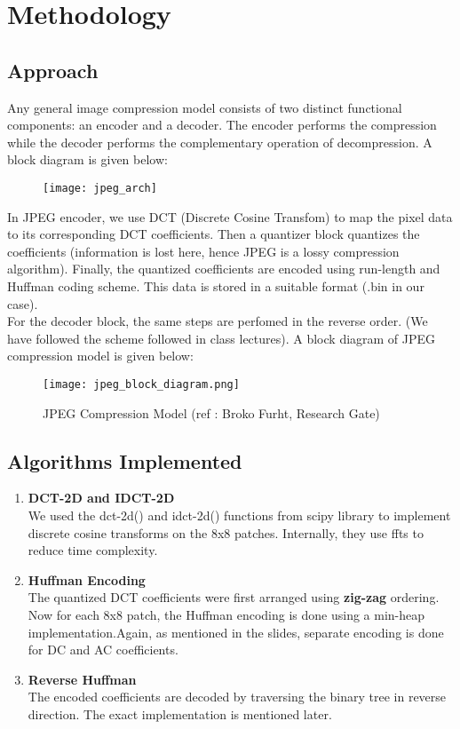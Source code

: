 \documentclass[12pt, a4paper]{report}
\begin{document}
	
	\chapter{Methodology}
	\section{Approach}
	Any general image compression model consists of two distinct functional components: an encoder and a decoder. The encoder performs the compression while the decoder performs the complementary operation of decompression. A block diagram is given below:
	\begin{figure}[H]
		\centering
		\texttt{[image: jpeg\_arch]}
		\caption[functional block diagram of image compression model (ref: Gozalez and Woods)]{}
		\label{fig:jpegarch}
	\end{figure}
	
	In JPEG encoder, we use DCT (Discrete Cosine Transfom) to map the pixel data to its corresponding DCT coefficients. Then a quantizer block quantizes the coefficients (information is lost here, hence JPEG is a lossy compression algorithm). Finally, the quantized coefficients are encoded using run-length and Huffman coding scheme. This data is stored in a suitable format (.bin in our case). \\
	For the decoder block, the same steps are perfomed in the reverse order. (We have followed the scheme followed in class lectures).\newpage
	A block diagram of JPEG compression model is given below:
	\begin{figure}[H]
		\centering
		\texttt{[image: jpeg\_block\_diagram.png]}
		\caption{JPEG Compression Model (ref : Broko Furht, Research Gate)}
	\end{figure}
	
	\section{Algorithms Implemented}
	\begin{enumerate}
		\item \textbf{DCT-2D and IDCT-2D}\\
			We used the dct-2d() and idct-2d() functions from scipy library to implement discrete cosine transforms on the 8x8 patches. Internally, they use ffts to reduce time complexity.
		\item \textbf{Huffman Encoding}\\
			The quantized DCT coefficients were first arranged using \textbf{zig-zag} ordering. Now for each 8x8 patch, the Huffman encoding is done using a min-heap implementation.Again, as mentioned in the slides, separate encoding is done for DC and AC coefficients.
		\item \textbf{Reverse Huffman}\\
			The encoded coefficients are decoded by traversing the binary tree in reverse direction. The exact implementation is mentioned later.
	\end{enumerate}
	
\end{document}
